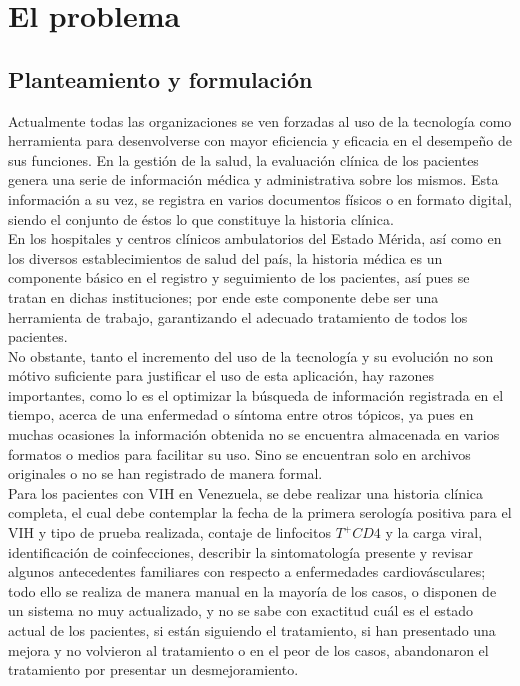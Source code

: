 \chapter{El problema}

\section{Planteamiento y formulaci\'on}

Actualmente todas las organizaciones se ven forzadas al uso de la tecnolog\'ia como herramienta para desenvolverse con mayor eficiencia y eficacia en el desempe\~no de sus funciones. En la gesti\'on de la salud, la evaluaci\'on cl\'inica de los pacientes genera una serie de informaci\'on m\'edica y administrativa sobre los mismos. Esta informaci\'on a su vez, se registra en varios documentos f\'isicos o en formato digital, siendo el conjunto de \'estos lo que constituye la historia cl\'inica. \\

En los hospitales y centros cl\'inicos ambulatorios del Estado M\'erida, as\'i como en los diversos establecimientos de salud del pa\'is, la historia m\'edica es un componente b\'asico en el registro y seguimiento de los pacientes, as\'i pues se tratan en dichas instituciones; por ende este componente debe ser una herramienta de trabajo, garantizando el adecuado tratamiento de todos los pacientes. \\

No obstante, tanto el incremento del uso de la tecnolog\'ia y su evoluci\'on no son m\'otivo suficiente para justificar el uso de esta aplicaci\'on, hay razones importantes, como lo es el optimizar la b\'usqueda de informaci\'on registrada en el tiempo, acerca de una enfermedad o s\'intoma entre otros t\'opicos, ya pues en muchas ocasiones la informaci\'on obtenida no se encuentra almacenada en varios formatos o medios para facilitar su uso. Sino se encuentran solo en archivos originales o no se han registrado de manera formal. \\ 

Para los pacientes con VIH en Venezuela, se debe realizar una historia cl\'inica completa, el cual debe contemplar la fecha de la primera serolog\'ia positiva para el VIH y tipo de prueba realizada, contaje de linfocitos $T^{+}CD4$ y la carga viral, identificaci\'on de coinfecciones, describir la sintomatolog\'ia presente y revisar algunos antecedentes familiares con respecto a enfermedades cardiov\'asculares; todo ello se realiza de manera manual en la mayor\'ia de los casos, o disponen de un sistema no muy actualizado, y no se sabe con exactitud cu\'al es el estado actual de los pacientes, si est\'an siguiendo el tratamiento, si han presentado una mejora y no volvieron al tratamiento o en el peor de los casos, abandonaron el tratamiento por presentar un desmejoramiento. \\

